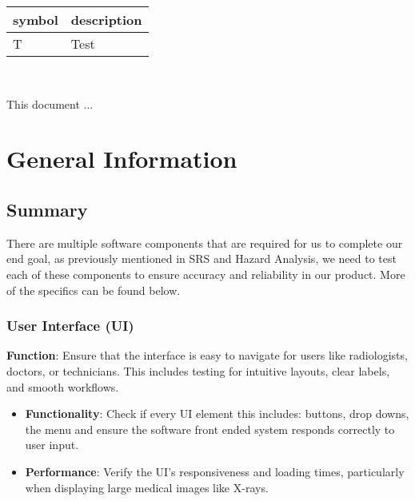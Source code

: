 \documentclass[12pt, titlepage]{article}
\begin{document}
\renewcommand{\arraystretch}{1.2}
\begin{tabular}{l l} 
  \toprule		
  \textbf{symbol} & \textbf{description}\\
  \midrule 
  T & Test\\
  \bottomrule
\end{tabular}\\



\newpage


This document ... 

\section{General Information}

\subsection{Summary}
There are multiple software components that are required for us to complete our end goal, as previously mentioned in SRS and Hazard Analysis, we need to test each of these components to ensure accuracy and reliability in our product. More of the specifics can be found below.  
\subsubsection{User Interface (UI)}
\textbf{Function}: Ensure that the interface is easy to navigate for users like radiologists, doctors, or technicians. This includes testing for intuitive layouts, clear labels, and smooth workflows.
\begin{itemize}
    \item \textbf{Functionality}: Check if every UI element this includes: buttons, drop downs, the menu and ensure the software front ended system responds correctly to user input.
    \item \textbf{Performance}: Verify the UI’s responsiveness and loading times, particularly when displaying large medical images like X-rays.
\end{itemize}
\end{document}
